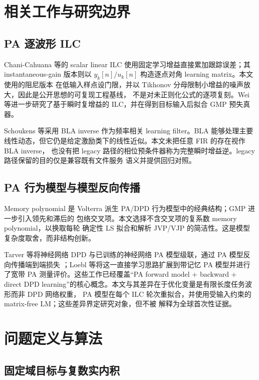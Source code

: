 \documentclass[UTF8,zihao=-4,a4paper]{ctexart}
\begin{document}
\section{相关工作与研究边界}

\subsection{PA 逐波形 ILC}

Chani-Cahuana 等的 scalar linear ILC 使用固定学习增益直接累加跟踪误差；其 instantaneous-gain
版本则以 $y_k[n]/u_k[n]$ 构造逐点对角 learning matrix\citep{chani2016ilc}。本文使用的阻尼版本
在低输入样点设门限，并以 Tikhonov 分母限制小增益的噪声放大，因此是公开思想的可复现工程基线，
不是对未正则化公式的逐项复刻。Wei 等进一步研究了基于瞬时复增益的 ILC，并在得到目标输入后拟合
GMP 预失真器\citep{wei2026icg}。

Schoukens 等采用 BLA inverse 作为频率相关 learning filter\citep{schoukens2017preinverse}。BLA
能够处理主要线性动态，但它仍是给定激励类下的线性近似。本文未把任意 FIR 的存在视作 BLA inverse，
也没有把 legacy 路径的相位预条件器称为完整瞬时增益逆。legacy 路径保留的目的仅是兼容既有文件服务
语义并提供回归对照。

\subsection{PA 行为模型与模型反向传播}

Memory polynomial 是 Volterra 派生 PA/DPD 行为模型中的经典结构；GMP 进一步引入领先和滞后的
包络交叉项\citep{morgan2006gmp}。本文选择不含交叉项的复系数 memory polynomial，以换取每轮
确定性 LS 拟合和解析 JVP/VJP 的简洁性。这是模型复杂度取舍，而非结构创新。

Tarver 等将神经网络 DPD 与已训练的神经网络 PA 模型级联，通过 PA 模型反向传播端到端损失
\citep{tarver2019backprop}；Loebl 等将这一直接学习思路扩展到带记忆 PA 模型并进行了宽带 PA
测量评价\citep{loebl2023memorybackprop}。这些工作已经覆盖“PA forward model + backward +
direct DPD learning”的核心概念。本文与其差异在于优化变量是有限长度任务波形而非 DPD 网络权重，
PA 模型在每个 ILC 轮次重拟合，并使用受输入约束的 matrix-free LM；这些差异界定研究对象，但不被
解释为全球首次性证据。

\section{问题定义与算法}

\subsection{固定域目标与复数实内积}
\end{document}
